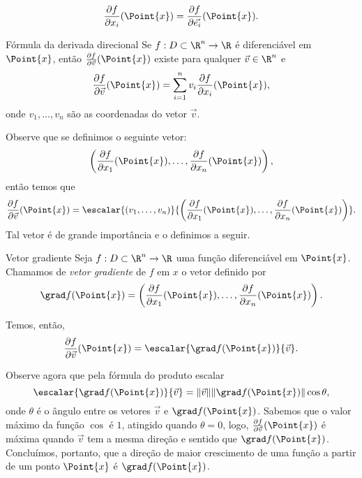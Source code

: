 \begin{example}{}{}
    $$\frac{\partial f}{\partial x_i}(\Point{x})=\frac{\partial f}{\partial \Vec{e_i}}(\Point{x}).$$
\end{example}

\begin{theorem}{Fórmula da derivada direcional}{}
    Se \( f:D\subset\R^n\to\R \) é diferenciável em $\Point{x}$, então 
    $\frac{\partial f}{\partial \Vec{v}} (\Point{x})$ existe para qualquer $\Vec{v}\in\R^n$ e 
    $$\frac{\partial f}{\partial \Vec{v}} (\Point{x})=\sum_{i=1}^nv_i\frac{\partial f}{\partial x_i}(\Point{x}),$$
    onde $v_1,\dots,v_n$ são as coordenadas do vetor $\vec{v}$. 
\end{theorem}

Observe que se definimos o seguinte vetor:
$$\left(\frac{\partial f}{\partial x_1}(\Point{x}), \dots, \frac{\partial f}{\partial x_n}(\Point{x})  \right),$$
então temos que 
$$\frac{\partial f}{\partial \Vec{v}} (\Point{x})=\escalar{(v_1,\dots,v_n)}{\left(\frac{\partial f}{\partial x_1}(\Point{x}), \dots, \frac{\partial f}{\partial x_n}(\Point{x})  \right)}.$$
Tal vetor é de grande importância e o definimos a seguir. 

\begin{definition}{Vetor gradiente}{}
Seja  \( f:D\subset\R^n\to\R \) uma função diferenciável em $\Point{x}$. Chamamos de \textit{vetor gradiente} de $f$ em $x$ o vetor definido por
    $$\grad f(\Point{x})=\left(\frac{\partial f}{\partial x_1}(\Point{x}), \dots, \frac{\partial f}{\partial x_n}(\Point{x})  \right).$$
\end{definition}
Temos, então,
$$\frac{\partial f}{\partial \Vec{v}} (\Point{x})=\escalar{\grad f(\Point{x})}{\vec{v}}.$$

Observe agora que pela fórmula do produto escalar
$$%
\escalar{\grad f(\Point{x})}{\vec{v}}=\|\Vec{v}\| \| \grad f(\Point{x})\| \cos \theta, $$
onde $\theta$ é o ângulo entre os vetores $\vec{v}$
 e $\grad f(\Point{x})$. Sabemos que o valor máximo da função $\cos$ é $1$, atingido quando $\theta=0$, logo, $\frac{\partial f}{\partial \Vec{v}}(\Point{x})$ é máxima quando $\vec{v}$ tem a mesma direção e sentido que $\grad f(\Point{x})$. Concluímos, portanto, que a direção de maior crescimento de uma função a partir de um ponto $\Point{x}$ é $\grad f(\Point{x})$. 
 